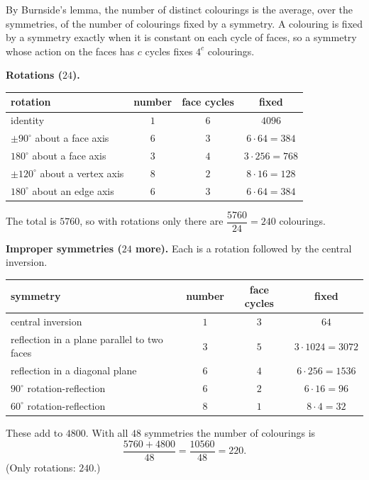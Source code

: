 By Burnside's lemma, the number of distinct colourings is the average, over the symmetries, of the number of colourings fixed by a symmetry. A colouring is fixed by a symmetry exactly when it is constant on each cycle of faces, so a symmetry whose action on the faces has $c$ cycles fixes $4^c$ colourings.

\textbf{Rotations ($24$).}
\begin{center}
\begin{tabular}{l|c|c|c}
rotation & number & face cycles & fixed\\ \hline
identity & $1$ & $6$ & $4096$\\
$\pm90^\circ$ about a face axis & $6$ & $3$ & $6\cdot64=384$\\
$180^\circ$ about a face axis & $3$ & $4$ & $3\cdot256=768$\\
$\pm120^\circ$ about a vertex axis & $8$ & $2$ & $8\cdot16=128$\\
$180^\circ$ about an edge axis & $6$ & $3$ & $6\cdot64=384$
\end{tabular}
\end{center}
The total is $5760$, so with rotations only there are $\dfrac{5760}{24}=240$ colourings.

\textbf{Improper symmetries ($24$ more).} Each is a rotation followed by the central inversion.
\begin{center}
\begin{tabular}{l|c|c|c}
symmetry & number & face cycles & fixed\\ \hline
central inversion & $1$ & $3$ & $64$\\
reflection in a plane parallel to two faces & $3$ & $5$ & $3\cdot1024=3072$\\
reflection in a diagonal plane & $6$ & $4$ & $6\cdot256=1536$\\
$90^\circ$ rotation-reflection & $6$ & $2$ & $6\cdot16=96$\\
$60^\circ$ rotation-reflection & $8$ & $1$ & $8\cdot4=32$
\end{tabular}
\end{center}
These add to $4800$. With all $48$ symmetries the number of colourings is
\[
\dfrac{5760+4800}{48}=\dfrac{10560}{48}=\boxed{220}.
\]
(Only rotations: $240$.)
